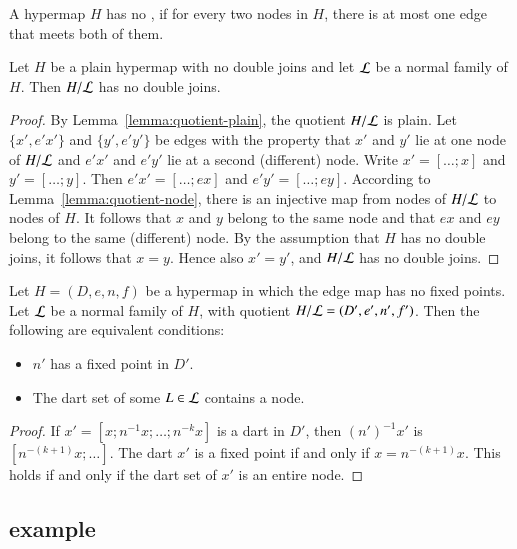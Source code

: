 \begin{definition}
A hypermap $H$ has no , if for every two nodes
in $H$, there is at most one edge that meets both of them.
\end{definition}


\begin{lemma}
Let $H$ be a plain hypermap with no double joins and let ${\cal L}$ be a normal
family of $H$.  Then $H/{\cal L}$ has no double joins.
\end{lemma}

\begin{proof} By Lemma~\ref{lemma:quotient-plain}, the quotient
  $H/{\cal L}$ is plain.  Let $\{x',e'x'\}$ and $\{y',e'y'\}$ be edges
  with the property that $x'$ and $y'$ lie at one node of $H/{\cal L}$
  and $e'x'$ and $e'y'$ lie at a second (different) node.  Write $x' =
  [\ldots;x]$ and $y' = [\ldots;y]$.  Then $e'x' = [\ldots;e x]$ and
  $e'y' = [\ldots;e y]$.  According to
  Lemma~\ref{lemma:quotient-node}, there is an injective map from
  nodes of $H/{\cal L}$ to nodes of $H$.  It follows that $x$ and $y$
  belong to the same node and that $e x$ and $e y$ belong to the same
  (different) node.  By the assumption that $H$ has no double joins,
  it follows that $x=y$.  Hence also $x' = y'$, and $H/{\cal L}$ has
  no double joins.
\end{proof}


\begin{lemma}\label{lemma:nfp}
Let $H=(D,e,n,f)$ be a hypermap in which the edge map has no fixed points.
Let ${\cal  L}$ be a normal family of $H$, with quotient $H/{\cal L} = (D',e',n',f')$.  
Then the following are equivalent conditions:
\begin{itemize}
\item $n'$ has a fixed point in $D'$.
\item The dart set of some $L\in {\cal L}$ contains a node.
\end{itemize}
\end{lemma}

\begin{proof}
If $x'=[x;n^{-1} x;\ldots;n^{-k} x]$ is a dart in $D'$, then $(n')^{-1}x'$ is
$[n^{-(k+1)} x;\ldots]$.  The dart $x'$ is a fixed point if and only if
$x = n^{-(k+1)} x$.  This holds if and only if the dart set of $x'$ is an entire node.
\end{proof}

\subsection{example}

